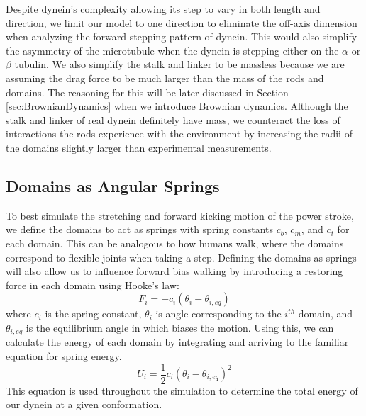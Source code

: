 Despite dynein's complexity allowing its step to vary in both length and direction, we limit our model to one direction to eliminate the off-axis dimension when analyzing the forward stepping pattern of dynein. This would also simplify the asymmetry of the microtubule when the dynein is stepping either on the $\alpha$ or $\beta$ tubulin. We also simplify the stalk and linker to be massless because we are assuming the drag force to be much larger than the mass of the rods and domains. The reasoning for this will be later discussed in Section \ref{sec:BrownianDynamics} when we introduce Brownian dynamics. Although the stalk and linker of real dynein definitely have mass, we counteract the loss of interactions the rods experience with the environment by increasing the radii of the domains slightly larger than experimental measurements.

\subsection{Domains as Angular Springs}
To best simulate the stretching and forward kicking motion of the power stroke, we define the domains to act as springs with spring constants $c_b$, $c_m$, and $c_t$ for each domain. This can be analogous to how humans walk, where the domains correspond to flexible joints when taking a step. Defining the domains as springs will also allow us to influence forward bias walking by introducing a restoring force in each domain using Hooke's law: 
\begin{equation}
    F_i=-c_i(\theta_i-\theta_{i,eq})
\end{equation}
where $c_i$ is the spring constant, $\theta_i$ is angle corresponding to the $i^{th}$ domain, and $\theta_{i,eq}$ is the equilibrium angle in which biases the motion. Using this, we can calculate the energy of each domain by integrating and arriving to the familiar equation for spring energy.
\begin{equation} \label{eqn:energy}
    U_i=\frac{1}{2}c_i(\theta_i-\theta_{i,eq})^2
\end{equation}
This equation is used throughout the simulation to determine the total energy of our dynein at a given conformation. 


